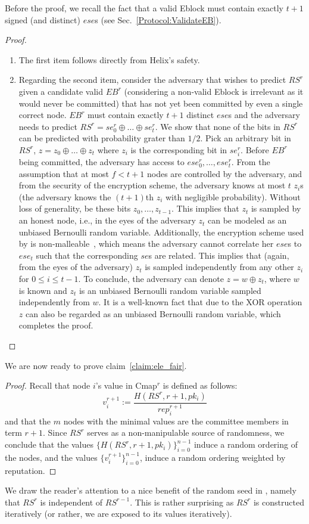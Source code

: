 \noindent Before the proof, we recall the fact that a valid Eblock must contain exactly $t+1$ signed (and distinct) $ese$s (see Sec.~\ref{Protocol:ValidateEB}).
\begin{proof}
$ $\\
\begin{enumerate}
\item The first item follows directly from Helix's safety.
\item Regarding the second item, consider the adversary that wishes to predict $RS^r$ given a candidate valid $EB^r$ (considering a non-valid Eblock is irrelevant as it would never be committed) that has not yet been committed by even a single correct node. $EB^r$ must contain exactly $t+1$ distinct $ese$s and the adversary needs to predict $RS^r=se^r_0 \oplus \dots \oplus se^r_{t}$. We show that none of the bits in $RS^r$ can be predicted with probability grater than $1/2$. Pick an arbitrary bit in $RS^r$, $z=z_0 \oplus \dots \oplus z_{t}$ where $z_i$ is the corresponding bit in $se^r_i$.
Before $EB^r$ being committed, the adversary has access to $ese^r_0,\dots,ese^r_{t}$. From the assumption that at most $f<t+1$ nodes are controlled by the adversary, and from the security of the encryption scheme, the adversary knows at most $t$ $z_i$s (the adversary knows the $(t+1)$th $z_i$ with negligible probability). Without loss of generality, be these bits $z_0,\dots,z_{t-1}$. This implies that $z_t$ is sampled by an honest node, i.e., in the eyes of the adversary $z_t$ can be modeled as an unbiased Bernoulli random variable.
Additionally, the encryption scheme used by \name is non-malleable~\cite{malleable}, which means the adversary cannot correlate her $ese$s to $ese_t$ such that the corresponding $se$s are related. This implies that (again, from the eyes of the adversary) $z_t$ is sampled independently from any other $z_i$ for $0\leq i \leq t-1$. To conclude, the adversary can denote $z=w\oplus z_t$, where $w$ is known and $z_t$ is an unbiased Bernoulli random variable sampled independently from $w$. It is a well-known fact that due to the XOR operation $z$ can also be regarded as an unbiased Bernoulli random variable, which completes the proof.  \qedhere
\end{enumerate}
\end{proof}

\noindent We are now ready to prove claim~\ref{claim:ele_fair}.
\begin{proof}
Recall that node $i$'s value in Cmap$^r$ is defined as follows: $$v_i^{r+1}:=\frac{H(RS^r,r+1,pk_i)}{rep^{r+1}_i}$$ and that the $m$ nodes with the minimal values are the committee members in term $r+1$. Since $RS^r$ serves as a non-manipulable source of randomness, we conclude that the values $\big\{H(RS^r,r+1,pk_i)\big\}_{i=0}^{n-1}$ induce a random ordering of the nodes, and the values $\{ v_i^{r+1} \}_{i=0}^{n-1}$, induce a random ordering weighted by reputation.   
\end{proof}
We draw the reader's attention to a nice benefit of the random seed in \nameNS, namely that $RS^r$ is independent of $RS^{r-1}$. This is rather surprising as $RS^r$ is constructed iteratively (or rather, we are exposed to its values iteratively).


